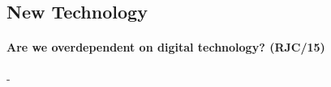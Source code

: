 \documentclass[../../main]{subfiles}
\begin{document}
\subsection{New Technology}

\paragraph{Are we overdependent on digital technology? (RJC/15)}-
\end{document}
